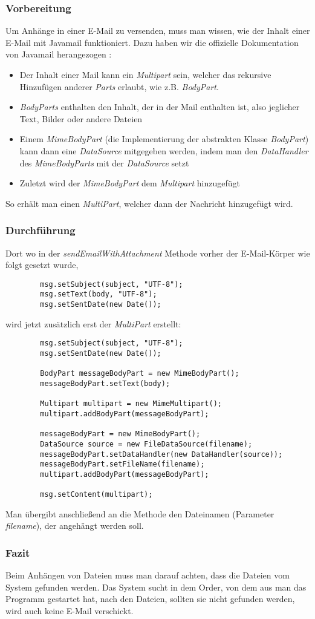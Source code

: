 		\subsubsection{\textbf{Vorbereitung}}
		Um Anhänge in einer E-Mail zu versenden, muss man wissen, wie der Inhalt einer E-Mail mit Javamail funktioniert. Dazu haben wir die offizielle Dokumentation von Javamail herangezogen \cite{javamail}:
		\begin{itemize}
		\item Der Inhalt einer Mail kann ein \textit{Multipart} sein, welcher das rekursive Hinzufügen anderer \textit{Parts} erlaubt, wie z.B. \textit{BodyPart}.
		\item \textit{BodyParts} enthalten den Inhalt, der in der Mail enthalten ist, also jeglicher Text, Bilder oder andere Dateien
		\item Einem \textit{MimeBodyPart} (die Implementierung der abstrakten Klasse \textit{BodyPart}) kann dann eine \textit{DataSource} mitgegeben werden, indem man den \textit{DataHandler} des \textit{MimeBodyParts} mit der \textit{DataSource} setzt
		\item Zuletzt wird der \textit{MimeBodyPart} dem \textit{Multipart} hinzugefügt
		\end{itemize}
		So erhält man einen \textit{MultiPart}, welcher dann der Nachricht hinzugefügt wird.
		\newpage
		\subsubsection{\textbf{Durchführung}}
		Dort wo in der \textit{sendEmailWithAttachment} Methode vorher der E-Mail-Körper wie folgt gesetzt wurde,
		\begin{verbatim}
		msg.setSubject(subject, "UTF-8");
		msg.setText(body, "UTF-8");
		msg.setSentDate(new Date());
		\end{verbatim}
		wird jetzt zusätzlich erst der \textit{MultiPart} erstellt:
		\begin{verbatim}
		msg.setSubject(subject, "UTF-8");
		msg.setSentDate(new Date());
		
		BodyPart messageBodyPart = new MimeBodyPart();
		messageBodyPart.setText(body);

		Multipart multipart = new MimeMultipart();
		multipart.addBodyPart(messageBodyPart);

		messageBodyPart = new MimeBodyPart();
		DataSource source = new FileDataSource(filename);
		messageBodyPart.setDataHandler(new DataHandler(source));
		messageBodyPart.setFileName(filename);
		multipart.addBodyPart(messageBodyPart);

		msg.setContent(multipart);
		\end{verbatim}
		Man übergibt anschließend an die Methode den Dateinamen (Parameter \textit{filename}), der angehängt werden soll.
		\subsubsection{\textbf{Fazit}}
		Beim Anhängen von Dateien muss man darauf achten, dass die Dateien vom System gefunden werden. Das System sucht in dem Order, von dem aus man das Programm gestartet hat, nach den Dateien, sollten sie nicht gefunden werden, wird auch keine E-Mail verschickt.